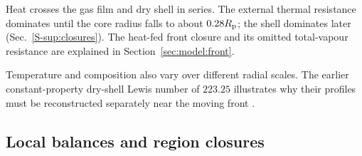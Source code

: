 Heat crosses the gas film and dry shell in series. The external thermal
resistance dominates until the core radius falls to about $0.28R_{\mathrm{p}}$;
the shell dominates later (Sec.~\ref*{S-sup:closures}). The heat-fed front
closure and its omitted total-vapour resistance are explained in
Section~\ref{sec:model:front}.

Temperature and composition also vary over different radial scales. The
earlier constant-property dry-shell Lewis number of $223.25$ illustrates why their profiles must be
reconstructed separately near the moving front
\citep{crank1956diffusion,perre2023stateoftheart}.

\subsection{Local balances and region closures}
\label{sec:model:geometry}
\label{sec:model:local}
\label{sec:model:wet}
\label{sec:model:dry}

